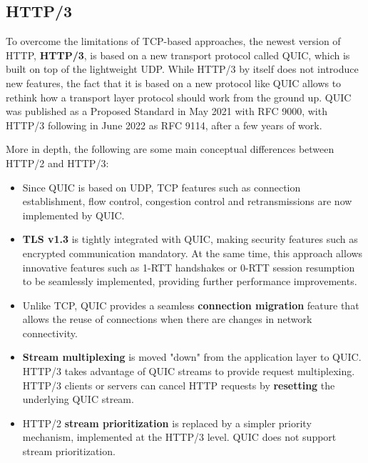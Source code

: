 \subsection{HTTP/3}
\label{sec:bg/http3}

To overcome the limitations of TCP-based approaches, the newest version of HTTP, \textbf{HTTP/3}, is based on a new transport protocol called QUIC, which is built on top of the lightweight UDP. While HTTP/3 by itself does not introduce new features, the fact that it is based on a new protocol like QUIC allows to rethink how a transport layer protocol should work from the ground up. QUIC was published as a Proposed Standard in May 2021 with RFC 9000, with HTTP/3 following in June 2022 as RFC 9114, after a few years of work.\cite{http3}

More in depth, the following are some main conceptual differences between HTTP/2 and HTTP/3:

\begin{itemize}
    \item Since QUIC is based on UDP, TCP features such as connection establishment, flow control, congestion control and retransmissions are now implemented by QUIC.
    \item \textbf{TLS v1.3} is tightly integrated with QUIC, making security features such as encrypted communication mandatory. At the same time, this approach allows innovative features such as 1-RTT handshakes or 0-RTT session resumption to be seamlessly implemented, providing further performance improvements.
    \item Unlike TCP, QUIC provides a seamless \textbf{connection migration} feature that allows the reuse of connections when there are changes in network connectivity.
    \item \textbf{Stream multiplexing} is moved "down" from the application layer to QUIC. HTTP/3 takes advantage of QUIC streams to provide request multiplexing. HTTP/3 clients or servers can cancel HTTP requests by \textbf{resetting} the underlying QUIC stream.
    \item HTTP/2 \textbf{stream prioritization} is replaced by a simpler priority mechanism, implemented at the HTTP/3 level. QUIC does not support stream prioritization.
\end{itemize}

